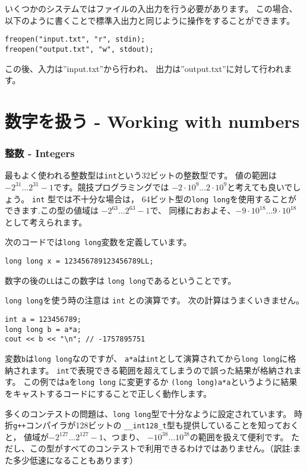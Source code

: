 いくつかのシステムではファイルの入出力を行う必要があります。
この場合、以下のように書くことで標準入出力と同じように操作をすることができます。
\begin{lstlisting}
freopen("input.txt", "r", stdin);
freopen("output.txt", "w", stdout);
\end{lstlisting}
この後、入力は''input.txt''から行われ、
出力は''output.txt''に対して行われます。

\section{数字を扱う - Working with numbers}


\subsubsection{整数 - Integers}

最もよく使われる整数型は\texttt{int}という32ビットの整数型です。
値の範囲は$-2^{31} \ldots 2^{31}-1$です。競技プログラミングでは
$-2 \cdot 10^9 \ldots 2 \cdot 10^9$と考えても良いでしょう。
\texttt{int} 型では不十分な場合は， 
64ビット型の\texttt{long long}を使用することができます.この型の値域は
$-2^{63} \ldots 2^{63}-1$で、
同様におおよそ、$-9 \cdot 10^{18} \ldots 9 \cdot 10^{18}$として考えられます。

次のコードでは\texttt{long long}変数を定義しています。
\begin{lstlisting}
long long x = 123456789123456789LL;
\end{lstlisting}
数字の後の\texttt{LL}はこの数字は
\texttt{long long}であるということです。

\texttt{long long}を使う時の注意は
\texttt{int} との演算です。
次の計算はうまくいきません。

\begin{lstlisting}
int a = 123456789;
long long b = a*a;
cout << b << "\n"; // -1757895751
\end{lstlisting}

変数\texttt{b}は\texttt{long long}なのですが、
\texttt{a*a}は\texttt{int}として演算されてから\texttt{long long}に格納されます。
\texttt{int}で表現できる範囲を超えてしまうので誤った結果が格納されます。
この例では\texttt{a}を\texttt{long long} に変更するか
\texttt{(long long)a*a}というように結果をキャストするコードにすることで正しく動作します。

多くのコンテストの問題は、\texttt{long long}型で十分なように設定されています。
時折\texttt{g++}コンパイラが128ビットの \texttt{\_\_int128\_t}型も提供していることを知っておくと，
値域が$-2^{127} \ldots 2^{127}-1$、つまり、 $-10^{38} \ldots 10^{38}$の範囲を扱えて便利です。
ただし、この型がすべてのコンテストで利用できるわけではありません。（訳註:また多少低速になることもあります）

